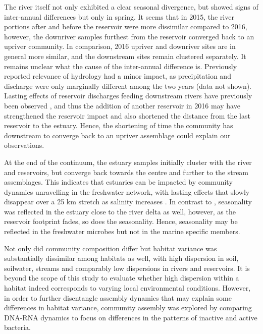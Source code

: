 \documentclass[12pt,a4paper]{article} %
\begin{document}
The river itself not only exhibited a clear seasonal divergence, but showed signs of inter-annual differences but only in spring. It seems that in 2015, the river portions after and before the reservoir were more dissimilar compared to 2016, however, the downriver samples furthest from the reservoir converged back to an upriver community. In comparison, 2016 upriver and downriver sites are in general more similar, and the downstream sites remain clustered separately. It remains unclear what the cause of the inter-annual difference is. Previously reported relevance of hydrology \citep{Nino-Garcia2016} had a minor impact, as precipitation and discharge were only marginally different among the two years (data not shown). Lasting effects of reservoir discharges feeding downstream rivers have previously been observed \citep{Ruiz-Gonzalez2013, Ruiz-Gonzalez2015a, Reis2020}, and thus the addition of another reservoir in 2016 may have strengthened the reservoir impact and also shortened the distance from the last reservoir to the estuary. Hence, the shortening of time the community has downstream to converge back to an upriver assemblage could explain our observations.

At the end of the continuum, the estuary samples initially cluster with the river and reservoirs, but converge back towards the centre and further to the stream assemblages. This indicates that estuaries can be impacted by community dynamics unravelling in the freshwater network, with lasting effects \citep{Hauptmann2016} that slowly disappear over a 25 km stretch as salinity increases \citep{Bouvier2002, Crump2004}. In contrast to \citet{Doherty2017}, seasonality was reflected in the estuary close to the river delta as well, however, as the reservoir footprint fades, so does the seasonality. Hence, seasonality may be reflected in the freshwater microbes but not in the marine specific members.

Not only did community composition differ but habitat variance was substantially dissimilar among habitats as well, with high dispersion in soil, soilwater, streams and comparably low dispersions in rivers and reservoirs. It is beyond the scope of this study to evaluate whether high dispersion within a habitat indeed corresponds to varying local environmental conditions. However, in order to further disentangle assembly dynamics that may explain some differences in habitat variance, community assembly was explored by comparing DNA-RNA dynamics to focus on differences in the patterns of inactive and active bacteria.
\end{document}
